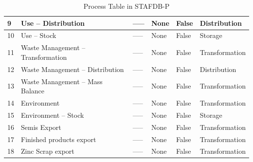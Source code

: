 \documentclass[ %
                    author={Tom Jager},
                supervisor={Dr. Daniel Schien},
                    degree={MEng},
                     title={A Bayesian Inference Engine for Calibrating Uncertainty over UMIS Structured MFA Systems},
                  subtitle={},
                      type={research},
                      year={2019} ]{dissertation}
\begin{document}
\begin{table}
\begin{tabular}{|l|p{4.5cm}|l|l|l|l|}
9                          & Use – Distribution                                   & -----               & None                               & False                        & Distribution                 \\ \hline
10                         & Use – Stock                                          & -----               & None                               & False                        & Storage                      \\ \hline
11                         & Waste Management – Transformation                     & -----               & None                               & False                        & Transformation               \\ \hline
12                         & Waste Management – Distribution                      & -----               & None                               & False                        & Distribution                 \\ \hline
13                         & Waste Management – Mass Balance                      & -----               & None                               & False                        & Transformation               \\ \hline
14                         & Environment                                          & -----               & None                               & False                        & Transformation               \\ \hline
15                         & Environment – Stock                                  & -----               & None                               & False                        & Storage                      \\ \hline
16                         & Semis Export                                         & -----               & None                               & False                        & Transformation               \\ \hline
17                         & Finished products export                             & -----               & None                               & False                        & Transformation               \\ \hline
18                         & Zinc Scrap export                                    & -----               & None                               & False                        & Transformation               \\ \hline
\end{tabular}
\caption{Process Table in STAFDB-P}
\end{table}
\end{document}
